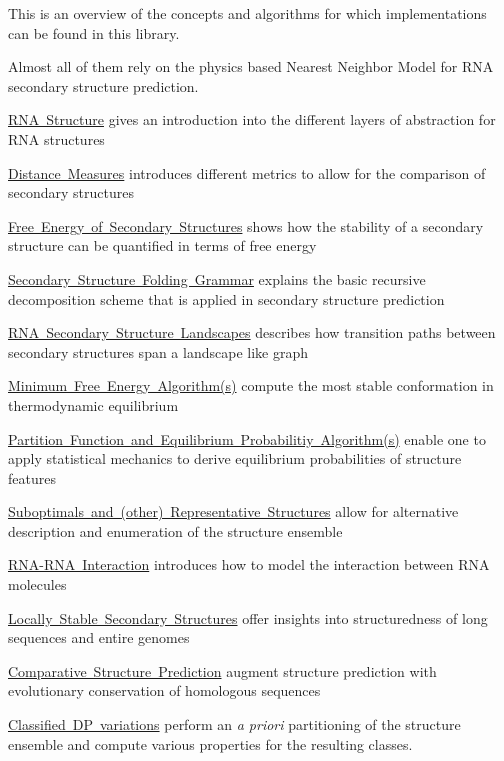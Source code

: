 This is an overview of the concepts and algorithms for which implementations can be found in this library.

Almost all of them rely on the physics based Nearest Neighbor Model for R\+NA secondary structure prediction.


\begin{DoxyItemize}
\item \mbox{\hyperlink{secondary_structures}{R\+NA Structure}} gives an introduction into the different layers of abstraction for R\+NA structures
\item \mbox{\hyperlink{distance_measures}{Distance Measures}} introduces different metrics to allow for the comparison of secondary structures
\item \mbox{\hyperlink{energy_evaluation}{Free Energy of Secondary Structures}} shows how the stability of a secondary structure can be quantified in terms of free energy
\item \mbox{\hyperlink{folding_grammar}{Secondary Structure Folding Grammar}} explains the basic recursive decomposition scheme that is applied in secondary structure prediction
\item \mbox{\hyperlink{secondary_structure_landscape}{R\+NA Secondary Structure Landscapes}} describes how transition paths between secondary structures span a landscape like graph
\item \mbox{\hyperlink{mfe_algorithm}{Minimum Free Energy Algorithm(s)}} compute the most stable conformation in thermodynamic equilibrium
\item \mbox{\hyperlink{pf_algorithm}{Partition Function and Equilibrium Probabilitiy Algorithm(s)}} enable one to apply statistical mechanics to derive equilibrium probabilities of structure features
\item \mbox{\hyperlink{suboptimal_structures}{Suboptimals and (other) Representative Structures}} allow for alternative description and enumeration of the structure ensemble
\item \mbox{\hyperlink{rip}{R\+N\+A-\/\+R\+NA Interaction}} introduces how to model the interaction between R\+NA molecules
\item \mbox{\hyperlink{local_vs_global}{Locally Stable Secondary Structures}} offer insights into structuredness of long sequences and entire genomes
\item \mbox{\hyperlink{consensus_structures}{Comparative Structure Prediction}} augment structure prediction with evolutionary conservation of homologous sequences
\item \mbox{\hyperlink{classified_dp}{Classified DP variations}} perform an {\itshape a priori} partitioning of the structure ensemble and compute various properties for the resulting classes.

\end{DoxyItemize}
